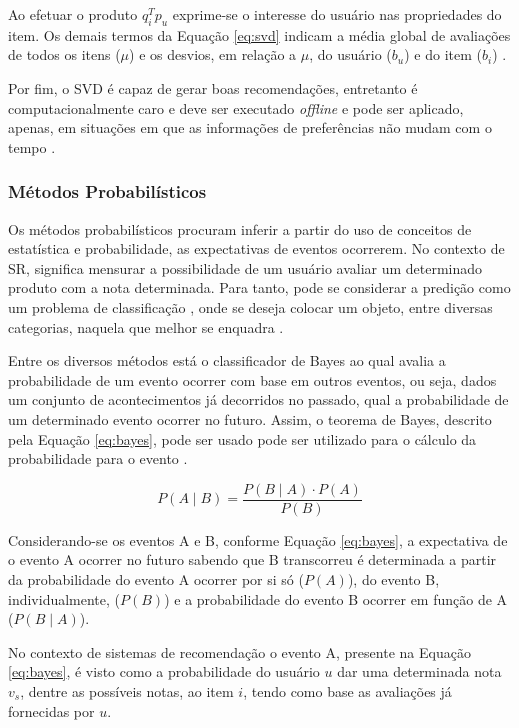         Ao efetuar o produto $q^T_ip_u$ exprime-se o interesse do usuário nas propriedades do item. Os demais termos da Equação \ref{eq:svd} indicam a média global de avaliações de todos os itens ($\mu$) e os desvios, em relação a $\mu$, do usuário ($b_u$) e do item ($b_i$) \cite{Ricci2010}.
        
        Por fim, o SVD é capaz de gerar boas recomendações, entretanto é computacionalmente caro e deve ser executado \textit{offline} e pode ser aplicado, apenas, em situações em que as informações de preferências não mudam com o tempo \cite{Bobadilla_2013}.
        
        \subsubsection{Métodos Probabilísticos}
        
        Os métodos probabilísticos procuram inferir a partir do uso de conceitos de estatística e probabilidade, as expectativas de eventos ocorrerem.  No contexto de SR, significa mensurar a possibilidade de um usuário avaliar um determinado produto com a nota determinada. Para tanto, pode se considerar a predição como um problema de classificação , onde se deseja colocar um objeto, entre diversas categorias, naquela que melhor se enquadra \cite{Jannach2010}.
                
        Entre os diversos métodos está o classificador de Bayes ao qual avalia a probabilidade de um evento ocorrer com base em outros eventos, ou seja, dados um conjunto de acontecimentos já decorridos no passado, qual a probabilidade de um determinado evento ocorrer no futuro. 
        Assim, o teorema de Bayes, descrito pela Equação \ref{eq:bayes}, pode ser usado pode ser utilizado para o cálculo da probabilidade para o evento \cite{Aggarwal2016}.
        
        \begin{equation}
            P(A \mid B) = \frac{P(B \mid A) \cdot P(A)}{P(B)} \label{eq:bayes}
        \end{equation}

        Considerando-se os eventos A e B, conforme Equação \ref{eq:bayes}, a expectativa de o evento A ocorrer no futuro sabendo que B transcorreu é determinada a partir da probabilidade do evento A ocorrer por si só ($P(A)$), do evento B, individualmente, ($P(B)$) e a probabilidade do evento B ocorrer em função de A ($P (B \mid A)$).
        
        No contexto de sistemas de recomendação o evento A, presente na Equação \ref{eq:bayes}, é visto como a probabilidade do usuário $u$ dar uma determinada nota $v_s$, dentre as possíveis notas, ao item $i$, tendo como base as avaliações já fornecidas por $u$. \cite{Aggarwal2016}
        
